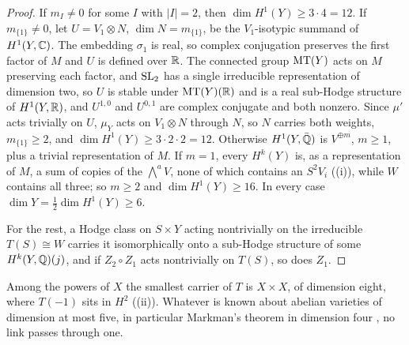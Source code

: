 \begin{proof}
If $m_{I}\ne0$ for some $I$ with $|I|=2$, then $\dim H^{1}(Y)\ge3\cdot4=12$.
If $m_{\{1\}}\ne0$, let $U=V_{1}\otimes N$, $\dim N=m_{\{1\}}$, be the
$V_{1}$-isotypic summand of $H^{1}(Y,\mathbb{C})$. The embedding $\sigma_{1}$ is
real, so complex conjugation preserves the first factor of $M$ and $U$ is
defined over $\mathbb{R}$. The connected group $\operatorname{MT}(Y)$ acts on $M$ preserving each
factor, and $\operatorname{SL}_{2}$ has a single irreducible representation of dimension
two, so $U$ is stable under $\operatorname{MT}(Y)(\mathbb{R})$ and is a real sub-Hodge structure
of $H^{1}(Y,\mathbb{R})$, and $U^{1,0}$ and $U^{0,1}$ are complex conjugate and
both nonzero. Since $\mu'$ acts trivially on $U$, $\mu_{Y}$ acts on
$V_{1}\otimes N$ through $N$, so $N$ carries both weights, $m_{\{1\}}\ge2$, and
$\dim H^{1}(Y)\ge3\cdot2\cdot2=12$. Otherwise $H^{1}(Y,\bar{\mathbb{Q}})$ is
$V^{\oplus m}$, $m\ge1$, plus a trivial representation of $M$. If $m=1$,
every $H^{k}(Y)$ is, as a representation of $M$, a sum of copies of the
$\bigwedge^{a}V$, none of which contains an $S^{2}V_{i}$
((i)), while $W$ contains all three; so $m\ge2$ and
$\dim H^{1}(Y)\ge16$. In every case $\dim Y=\frac12\dim H^{1}(Y)\ge6$.

For the rest, a Hodge class on $S\times Y$ acting nontrivially on the
irreducible $T(S)\cong W$ carries it isomorphically onto a sub-Hodge structure
of some $H^{k}(Y,\mathbb{Q})(j)$, and if $Z_{2}\circ Z_{1}$ acts nontrivially on
$T(S)$, so does $Z_{1}$.
\end{proof}

Among the powers of $X$ the smallest carrier of $T$ is $X\times X$, of
dimension eight, where $T(-1)$ sits in $H^{2}$
((ii)). Whatever is known about abelian varieties of
dimension at most five, in particular Markman's theorem in dimension four
\cite{Mar25a}, no link passes through one.

